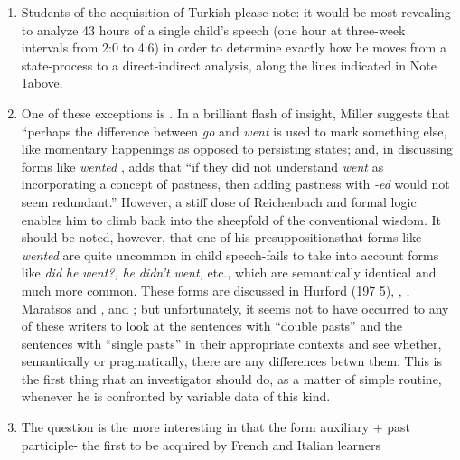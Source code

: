 \begin{enumerate}
\item Students of the acquisition of Turkish please note: it would be most revealing to analyze 43 hours of a single child's speech (one hour at three-week intervals from 2:0 to 4:6) in order to determine exactly how he moves from a state-process to a direct-indirect analysis, along the lines indicated in Note 1above.
\item One of these exceptions is \citet{Miller1978}. In a brilliant flash of insight, Miller suggests that ``perhaps the difference between \textit{go} and \textit{went} is used to mark something else, like momentary happen\-ings as opposed to persisting states{\textquotedbl}; and, in discussing forms like \textit{wented} , adds that ``if they did not understand \textit{went} as incorporating a concept of pastness, then adding pastness with \textit{{}-ed} would not seem redundant.'' However, a stiff dose of Reichenbach and formal logic enables him to climb back into the sheepfold of the conventional wisdom. It should be noted, however, that one of his presuppositions\-that forms like \textit{wented} are quite uncommon in child speech-fails to take into account forms like \textit{did} \textit{he} \textit{went?,} \textit{he} \textit{didn't} \textit{went,} etc., which are semantically identical and much more common. These forms are discussed in Hurford (197 5), \citet{Kuczaj1976}, \citet{Fay1978}, Maratsos and \citet{Kuczaj1978}, and \citet{ErreichEtAl1980}; but unfortunately, it seems not to have occurred to any of these writers to look at the sentences with ``double pasts'' and the sentences with ``single pasts'' in their appropriate contexts and see whether, semantically or pragmatically, there are any differences betwn them. This is the first thing rhat
an investigator should do, as a matter of simple routine, whenever he is confronted by variable data of this kind.
\item The question is the more interesting in that the form auxiliary
+ past participle- the first to be acquired by French and Italian learners

\end{enumerate}
